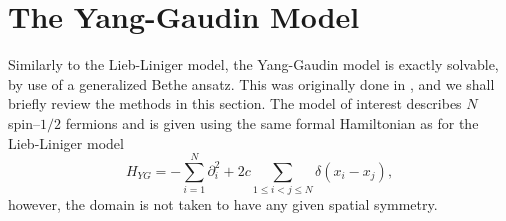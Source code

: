\section{The Yang-Gaudin Model}
\label{SectionYG}
Similarly to the Lieb-Liniger model, the Yang-Gaudin model is exactly solvable, by use of a generalized Bethe ansatz. This was originally done in \cite{yang1967some}, and we shall briefly review the methods in this section.
The model of interest describes $ N $ spin--$ 1/2 $ fermions and is given using the same formal Hamiltonian as for the Lieb-Liniger model\begin{equation}\label{EqYGHamiltonian}
H_{YG}=-\sum_{i=1}^{N}\partial_i^2+2c\sum_{1\leq i<j\leq N}\delta(x_i-x_j),
\end{equation}
however, the domain is not taken to have any given spatial symmetry. 
